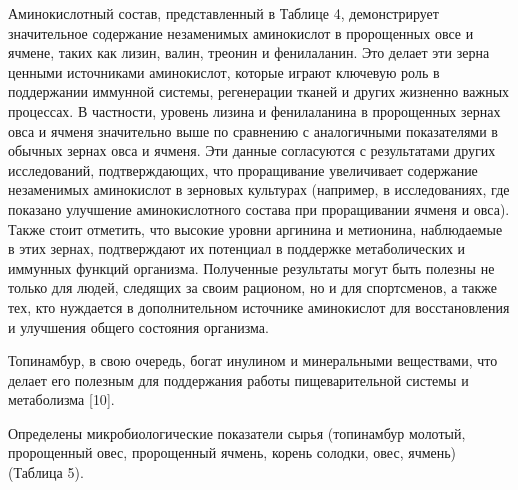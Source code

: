 
\begin{multicols}{2}
Аминокислотный состав, представленный в Таблице 4, демонстрирует
значительное содержание незаменимых аминокислот в пророщенных овсе и
ячмене, таких как лизин, валин, треонин и фенилаланин. Это делает эти
зерна ценными источниками аминокислот, которые играют ключевую роль в
поддержании иммунной системы, регенерации тканей и других жизненно
важных процессах. В частности, уровень лизина и фенилаланина в
пророщенных зернах овса и ячменя значительно выше по сравнению с
аналогичными показателями в обычных зернах овса и ячменя. Эти данные
согласуются с результатами других исследований, подтверждающих, что
проращивание увеличивает содержание незаменимых аминокислот в зерновых
культурах (например, в исследованиях, где показано улучшение
аминокислотного состава при проращивании ячменя и овса). Также стоит
отметить, что высокие уровни аргинина и метионина, наблюдаемые в этих
зернах, подтверждают их потенциал в поддержке метаболических и иммунных
функций организма. Полученные результаты могут быть полезны не только
для людей, следящих за своим рационом, но и для спортсменов, а также
тех, кто нуждается в дополнительном источнике аминокислот для
восстановления и улучшения общего состояния организма.

Топинамбур, в свою очередь, богат инулином и минеральными веществами,
что делает его полезным для поддержания работы пищеварительной системы и
метаболизма {[}10{]}.

Определены микробиологические показатели сырья (топинамбур молотый,
пророщенный овес, пророщенный ячмень, корень солодки, овес, ячмень)
(Таблица 5).
\end{multicols}

